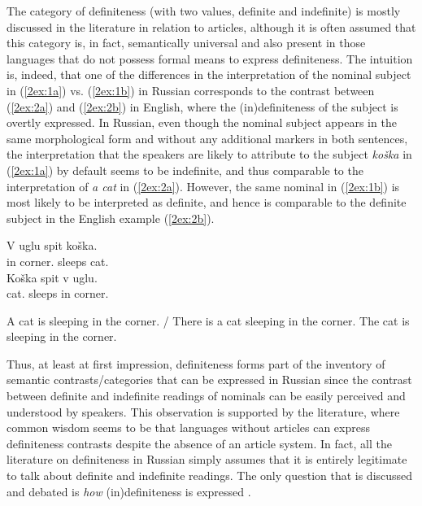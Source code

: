 \documentclass[output=paper]{langsci/langscibook}
\begin{document}
The category of definiteness (with two values, definite and indefinite) is mostly discussed in the literature in relation to articles, although it is often assumed that this category is, in fact, semantically universal and also present in those languages that do not possess formal means to express definiteness. The intuition is, indeed, that one of the differences in the interpretation of the nominal subject in (\ref{2ex:1a}) vs. (\ref{2ex:1b}) in Russian corresponds to the contrast between (\ref{2ex:2a}) and (\ref{2ex:2b}) in English, where the (in)definiteness of the subject is overtly expressed. In Russian, even though the nominal subject appears in the same morphological form and without any additional markers in both sentences, the interpretation that the speakers are likely to attribute to the subject {\emph{ko\v{s}ka}} in (\ref{2ex:1a}) by default seems to be indefinite, and thus comparable to the interpretation of {\emph{a cat}} in (\ref{2ex:2a}). However, the same nominal in (\ref{2ex:1b}) is most likely to be interpreted as definite, and hence is comparable to the definite subject in the English example (\ref{2ex:2b}).

\begin{exe}
\ex\label{2ex:1}
	\begin{xlista}
	\ex\label{2ex:1a}
	\gll V uglu spit ko\v{s}ka. \\
	in corner.{} sleeps cat.{} \\
	\glt 
	\ex\label{2ex:1b}
	\gll Ko\v{s}ka spit v uglu. \\
	cat.{} sleeps in corner.{} \\
	\glt 
	\end{xlista}
\ex\label{2ex:2}
	\begin{xlista}
	\ex\label{2ex:2a}
	A cat is sleeping in the corner. / There is a cat sleeping in the corner.
	\ex\label{2ex:2b}
	The cat is sleeping in the corner. 
	\end{xlista}
\end{exe}

Thus, at least at first impression, definiteness forms part of the inventory of semantic contrasts/categories that can be expressed in Russian since the contrast between definite and indefinite readings of nominals can be easily perceived and understood by speakers. This observation is supported by the literature, where common wisdom seems to be that languages without articles can express definiteness contrasts despite the absence of an article system. In fact, all the literature on definiteness in Russian simply assumes that it is entirely legitimate to talk about definite and indefinite readings. The only question that is discussed and debated is {\emph{how}} (in)definiteness is expressed \citep[see, for instance,][]{galkina:fedoruk:63,pospelov:70,krylov:84,nesset:99}.
\end{document}

